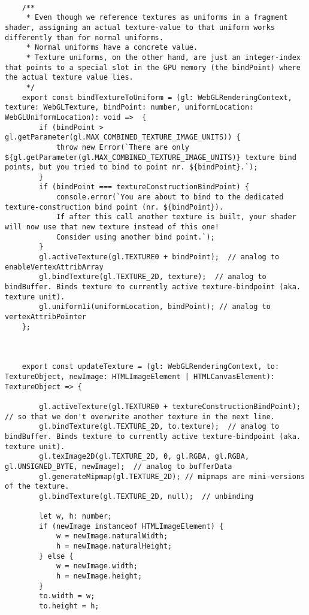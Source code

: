 {\begin{lstlisting}
    
    /**
     * Even though we reference textures as uniforms in a fragment shader, assigning an actual texture-value to that uniform works differently than for normal uniforms.
     * Normal uniforms have a concrete value.
     * Texture uniforms, on the other hand, are just an integer-index that points to a special slot in the GPU memory (the bindPoint) where the actual texture value lies.
     */
    export const bindTextureToUniform = (gl: WebGLRenderingContext, texture: WebGLTexture, bindPoint: number, uniformLocation: WebGLUniformLocation): void =>  {
        if (bindPoint > gl.getParameter(gl.MAX_COMBINED_TEXTURE_IMAGE_UNITS)) {
            throw new Error(`There are only ${gl.getParameter(gl.MAX_COMBINED_TEXTURE_IMAGE_UNITS)} texture bind points, but you tried to bind to point nr. ${bindPoint}.`);
        }
        if (bindPoint === textureConstructionBindPoint) {
            console.error(`You are about to bind to the dedicated texture-construction bind point (nr. ${bindPoint}).
            If after this call another texture is built, your shader will now use that new texture instead of this one!
            Consider using another bind point.`);
        }
        gl.activeTexture(gl.TEXTURE0 + bindPoint);  // analog to enableVertexAttribArray
        gl.bindTexture(gl.TEXTURE_2D, texture);  // analog to bindBuffer. Binds texture to currently active texture-bindpoint (aka. texture unit).
        gl.uniform1i(uniformLocation, bindPoint); // analog to vertexAttribPointer
    };
    
    
    
    export const updateTexture = (gl: WebGLRenderingContext, to: TextureObject, newImage: HTMLImageElement | HTMLCanvasElement): TextureObject => {
    
        gl.activeTexture(gl.TEXTURE0 + textureConstructionBindPoint); // so that we don't overwrite another texture in the next line.
        gl.bindTexture(gl.TEXTURE_2D, to.texture);  // analog to bindBuffer. Binds texture to currently active texture-bindpoint (aka. texture unit).
        gl.texImage2D(gl.TEXTURE_2D, 0, gl.RGBA, gl.RGBA, gl.UNSIGNED_BYTE, newImage);  // analog to bufferData
        gl.generateMipmap(gl.TEXTURE_2D); // mipmaps are mini-versions of the texture.
        gl.bindTexture(gl.TEXTURE_2D, null);  // unbinding
    
        let w, h: number;
        if (newImage instanceof HTMLImageElement) {
            w = newImage.naturalWidth;
            h = newImage.naturalHeight;
        } else {
            w = newImage.width;
            h = newImage.height;
        }
        to.width = w;
        to.height = h;
    

\end{lstlisting}}
